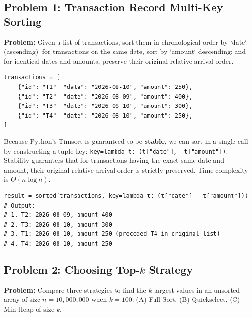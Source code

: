\documentclass[11pt,a4paper]{article}
\begin{document}
\subsection{Problem 1: Transaction Record Multi-Key Sorting}
\textbf{Problem:} Given a list of transactions, sort them in chronological order by `date` (ascending); for transactions on the same date, sort by `amount` descending; and for identical dates and amounts, preserve their original relative arrival order.
\begin{lstlisting}[style=pythonstyle]
transactions = [
    {"id": "T1", "date": "2026-08-10", "amount": 250},
    {"id": "T2", "date": "2026-08-09", "amount": 400},
    {"id": "T3", "date": "2026-08-10", "amount": 300},
    {"id": "T4", "date": "2026-08-10", "amount": 250},
]
\end{lstlisting}

\begin{definitionbox}
Because Python's Timsort is guaranteed to be \textbf{stable}, we can sort in a single call by constructing a tuple key: \lstinline{key=lambda t: (t["date"], -t["amount"])}. Stability guarantees that for transactions having the exact same date and amount, their original relative arrival order is strictly preserved. Time complexity is $\Theta(n \log n)$.
\end{definitionbox}

\begin{lstlisting}[style=pythonstyle]
result = sorted(transactions, key=lambda t: (t["date"], -t["amount"]))
# Output:
# 1. T2: 2026-08-09, amount 400
# 2. T3: 2026-08-10, amount 300
# 3. T1: 2026-08-10, amount 250 (preceded T4 in original list)
# 4. T4: 2026-08-10, amount 250
\end{lstlisting}

\subsection{Problem 2: Choosing Top-\texorpdfstring{$k$}{k} Strategy}
\textbf{Problem:} Compare three strategies to find the $k$ largest values in an unsorted array of size $n = 10,000,000$ when $k = 100$: (A) Full Sort, (B) Quickselect, (C) Min-Heap of size $k$.
\end{document}
